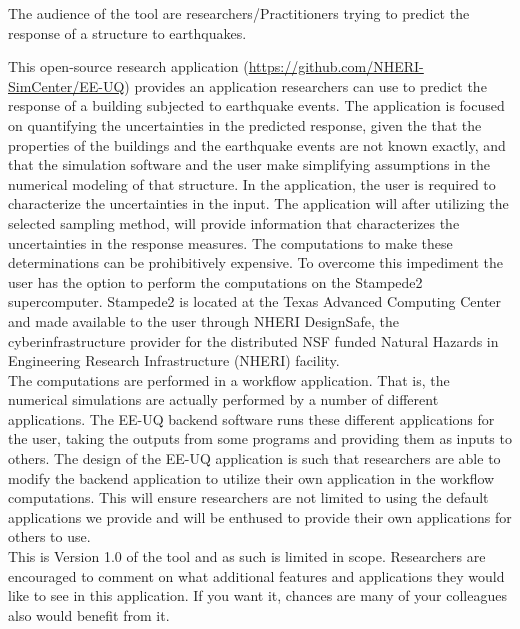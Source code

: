 The audience of the tool are researchers/Practitioners trying to predict the response of a structure to earthquakes.

This open-source research application (\href{https://github.com/NHERI-SimCenter/EE-UQ}{https://github.com/NHERI-SimCenter/EE-UQ}) 
provides an application researchers can use to predict the response of a building subjected to earthquake events. The application is focused 
on quantifying the uncertainties in the predicted response, given the that the properties of the buildings and the earthquake events are not known exactly, 
and that the simulation software and the user make simplifying assumptions in the numerical modeling of that structure. In the application, 
the user is required to characterize the uncertainties in the input. The application will after utilizing the selected sampling method, 
will provide information that characterizes the uncertainties in the response measures. The computations to make these determinations 
can be prohibitively expensive. To overcome this impediment the user has the option to perform the computations on the Stampede2 
supercomputer. Stampede2 is located at the Texas Advanced Computing Center and made available to the user through NHERI DesignSafe, 
the cyberinfrastructure provider for the distributed NSF funded Natural Hazards in Engineering Research Infrastructure (NHERI) facility.\\

The computations are performed in a workflow application. That is, the numerical simulations are actually performed by a number of 
different applications. The EE-UQ backend software runs these different applications for the user, taking the outputs from some programs 
and providing them as inputs to others. The design of the EE-UQ application is such that researchers are able to modify the backend 
application to utilize their own application in the workflow computations. This will ensure researchers are not limited to using the 
default applications we provide and will be enthused to provide their own applications for others to use. \\

This is Version 1.0 of the tool and as such is limited in scope. Researchers are encouraged to comment on what additional features and 
applications they would like to see in this application. If you want it, chances are many of your colleagues also would benefit from it.\\
\\
